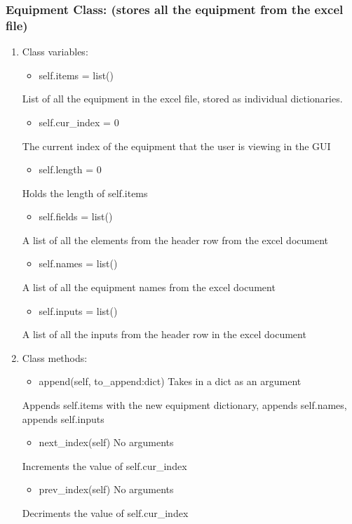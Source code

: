 \documentclass[11pt]{article}
\begin{document}
\subsubsection{Equipment Class: (stores all the equipment from the excel file)}
\label{sec:orgb7f026f}
\begin{enumerate}
\item Class variables:
\label{sec:orgd411f6d}
\begin{itemize}
\item self.items = list()
\end{itemize}
List of all the equipment in the excel file, stored as individual dictionaries.

\begin{itemize}
\item self.cur\_index = 0
\end{itemize}
The current index of the equipment that the user is viewing in the GUI

\begin{itemize}
\item self.length = 0
\end{itemize}
Holds the length of self.items

\begin{itemize}
\item self.fields = list()
\end{itemize}
A list of all the elements from the header row from the excel document

\begin{itemize}
\item self.names = list()
\end{itemize}
A list of all the equipment names from the excel document

\begin{itemize}
\item self.inputs = list()
\end{itemize}
A list of all the inputs from the header row in the excel document

\item Class methods:
\label{sec:orga529c03}

\begin{itemize}
\item append(self, to\_append:dict) Takes in a dict as an argument
\end{itemize}
Appends self.items with the new equipment dictionary, appends self.names, appends self.inputs

\begin{itemize}
\item next\_index(self) No arguments
\end{itemize}
Increments the value of self.cur\_index

\begin{itemize}
\item prev\_index(self) No arguments
\end{itemize}
Decriments the value of self.cur\_index
\end{enumerate}
\end{document}
